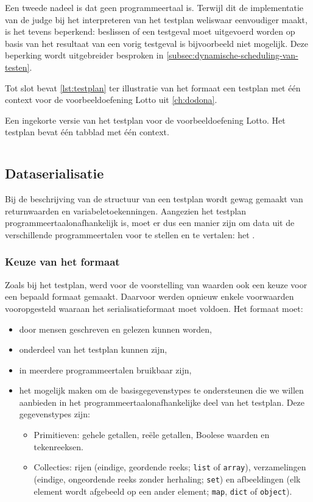 Een tweede nadeel is dat  geen programmeertaal is.
Terwijl dit de implementatie van de judge bij het interpreteren van het testplan weliswaar eenvoudiger maakt, is het tevens beperkend: beslissen of een testgeval moet uitgevoerd worden op basis van het resultaat van een vorig testgeval is bijvoorbeeld niet mogelijk.
Deze beperking wordt uitgebreider besproken in \cref{subsec:dynamische-scheduling-van-testen}.

Tot slot bevat \cref{lst:testplan} ter illustratie van het formaat een testplan met één context voor de voorbeeldoefening Lotto uit \cref{ch:dodona}.

\begin{listing}
    \caption{
    Een ingekorte versie van het testplan voor de voorbeeldoefening Lotto.
    Het testplan bevat één tabblad met één context.
    }
    \label{lst:testplan}
    \inputminted{python}{code/testplan.json}
\end{listing}

\subsection{Dataserialisatie}\label{subsec:dataserialisatie}

Bij de beschrijving van de structuur van een testplan wordt gewag gemaakt van returnwaarden en variabeletoekenningen.
Aangezien het testplan programmeertaalonafhankelijk is, moet er dus een manier zijn om data uit de verschillende programmeertalen voor te stellen en te vertalen: het .

\subsubsection{Keuze van het formaat}

Zoals bij het testplan, werd voor de voorstelling van waarden ook een keuze voor een bepaald formaat gemaakt.
Daarvoor werden opnieuw enkele voorwaarden vooropgesteld waaraan het serialisatieformaat moet voldoen.
Het formaat moet:

\begin{itemize}
    \item door mensen geschreven en gelezen kunnen worden,
    \item onderdeel van het testplan kunnen zijn,
    \item in meerdere programmeertalen bruikbaar zijn,
    \item het mogelijk maken om de basisgegevenstypes te ondersteunen die we willen aanbieden in het programmeertaalonafhankelijke deel van het testplan.
    Deze gegevenstypes zijn:
    \begin{itemize}
        \item Primitieven: gehele getallen, reële getallen, Boolese waarden en tekenreeksen.
        \item Collecties: rijen (eindige, geordende reeks; \texttt{list} of \texttt{array}), verzamelingen (eindige, ongeordende reeks zonder herhaling; \texttt{set}) en afbeeldingen (elk element wordt afgebeeld op een ander element; \texttt{map}, \texttt{dict} of \texttt{object}).
    \end{itemize}
\end{itemize}


